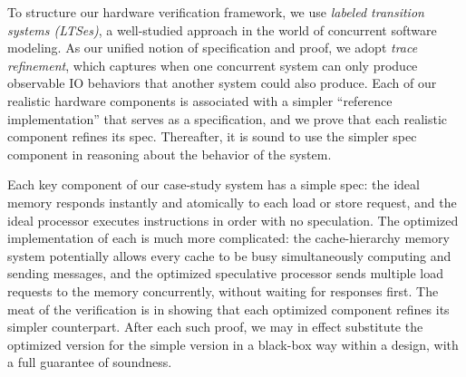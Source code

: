 To structure our hardware verification framework, we use \emph{labeled
transition systems (LTSes)}, a well-studied approach in the world of
concurrent software modeling.  As our unified notion of specification and
proof, we adopt \emph{trace refinement}, which captures when one concurrent
system can only produce observable IO behaviors that another system could also
produce.  Each of our realistic hardware components is associated with a
simpler ``reference implementation'' that serves as a specification, and we
prove that each realistic component refines its spec.  Thereafter, it is sound
to use the simpler spec component in reasoning about the behavior of the
system.

Each key component of our case-study system has a simple spec: the ideal memory
responds instantly and atomically to each load or store request, and the ideal
processor executes instructions in order with no speculation.  The optimized
implementation of each is much more complicated: the cache-hierarchy memory
system potentially allows every cache to be busy simultaneously computing and
sending messages, and the optimized speculative processor sends multiple load
requests to the memory concurrently, without waiting for responses first.  The meat
of the verification is in showing that each optimized component refines its
simpler counterpart.  After each such proof, we may in effect substitute the
optimized version for the simple version in a black-box way within a design,
with a full guarantee of soundness.

